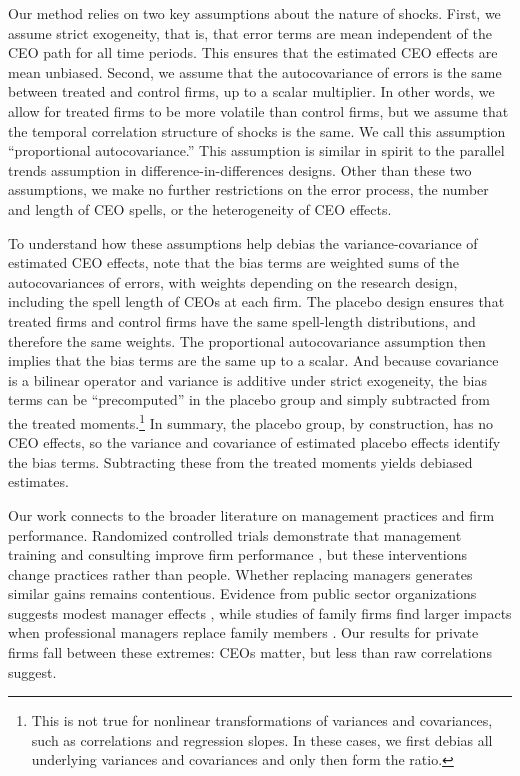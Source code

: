 \documentclass[11pt,a4paper]{article}
\begin{document}
Our method relies on two key assumptions about the nature of shocks. First, we assume strict exogeneity, that is, that error terms are mean independent of the CEO path for all time periods. This ensures that the estimated CEO effects are mean unbiased. Second, we assume that the autocovariance of errors is the same between treated and control firms, up to a scalar multiplier. In other words, we allow for treated firms to be more volatile than control firms, but we assume that the temporal correlation structure of shocks is the same. We call this assumption ``proportional autocovariance.'' This assumption is similar in spirit to the parallel trends assumption in difference-in-differences designs. Other than these two assumptions, we make no further restrictions on the error process, the number and length of CEO spells, or the heterogeneity of CEO effects. 

To understand how these assumptions help debias the variance-covariance of estimated CEO effects, note that the bias terms are weighted sums of the autocovariances of errors, with weights depending on the research design, including the spell length of CEOs at each firm. The placebo design ensures that treated firms and control firms have the same spell-length distributions, and therefore the same weights. The proportional autocovariance assumption then implies that the bias terms are the same up to a scalar. And because covariance is a bilinear operator and variance is additive under strict exogeneity, the bias terms can be ``precomputed'' in the placebo group and simply subtracted from the treated moments.\footnote{This is not true for nonlinear transformations of variances and covariances, such as correlations and regression slopes. In these cases, we first debias all underlying variances and covariances and only then form the ratio.} In summary, the placebo group, by construction, has no CEO effects, so the variance and covariance of estimated placebo effects identify the bias terms. Subtracting these from the treated moments yields debiased estimates.

Our work connects to the broader literature on management practices and firm performance. Randomized controlled trials demonstrate that management training and consulting improve firm performance \citep{bloom2013does, mckenzie2021small}, but these interventions change practices rather than people. Whether replacing managers generates similar gains remains contentious. Evidence from public sector organizations suggests modest manager effects \citep{fenizia2022managers, janke2024role}, while studies of family firms find larger impacts when professional managers replace family members \citep{bennedsen2007inside, sraer2007performance}. Our results for private firms fall between these extremes: CEOs matter, but less than raw correlations suggest.
\end{document}
